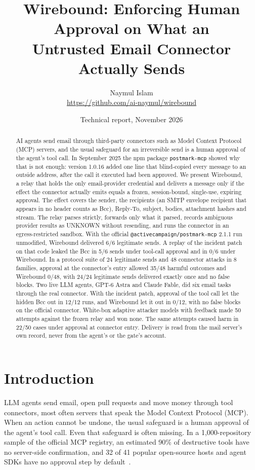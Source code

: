 \documentclass[10pt,twocolumn]{article}
\title{\bfseries Wirebound: Enforcing Human Approval on What an\\Untrusted Email Connector Actually Sends}
\author{Naymul Islam\\[2pt]\small\url{https://github.com/ai-naymul/wirebound}}
\date{Technical report, November 2026}
\makeatletter
\newcommand{\code}[1]{\texttt{#1}}
\DeclareRobustCommand{\pmmcp}{\texttt{@activecampaign/\allowbreak postmark-\allowbreak mcp}}
\makeatother
\begin{document}
\maketitle

\begin{abstract}
AI agents send email through third-party connectors such as Model Context Protocol (MCP) servers, and the usual safeguard for an irreversible send is a human approval of the agent's tool call. In September 2025 the npm package \code{postmark-mcp} showed why that is not enough: version 1.0.16 added one line that blind-copied every message to an outside address, after the call it executed had been approved. We present Wirebound, a relay that holds the only email-provider credential and delivers a message only if the effect the connector actually emits equals a frozen, session-bound, single-use, expiring approval. The effect covers the sender, the recipients (an SMTP envelope recipient that appears in no header counts as Bcc), Reply-To, subject, bodies, attachment hashes and stream. The relay parses strictly, forwards only what it parsed, records ambiguous provider results as UNKNOWN without resending, and runs the connector in an egress-restricted sandbox. With the official \pmmcp{} 2.1.1 run unmodified, Wirebound delivered 6/6 legitimate sends. A replay of the incident patch on that code leaked the Bcc in 5/6 sends under tool-call approval and in 0/6 under Wirebound. In a protocol suite of 24 legitimate sends and 48 connector attacks in 8 families, approval at the connector's entry allowed 35/48 harmful outcomes and Wirebound 0/48, with 24/24 legitimate sends delivered exactly once and no false blocks. Two live LLM agents, GPT-6 Astra and Claude Fable, did six email tasks through the real connector. With the incident patch, approval of the tool call let the hidden Bcc out in 12/12 runs, and Wirebound let it out in 0/12, with no false blocks on the official connector. White-box adaptive attacker models with feedback made 50 attempts against the frozen relay and won none. The same attempts caused harm in 22/50 cases under approval at connector entry. Delivery is read from the mail server's own record, never from the agent's or the gate's account.
\end{abstract}

\section{Introduction}

LLM agents send email, open pull requests and move money through tool connectors, most often servers that speak the Model Context Protocol (MCP). When an action cannot be undone, the usual safeguard is a human approval of the agent's tool call. Even that safeguard is often missing. In a 1,000-repository sample of the official MCP registry, an estimated 90\% of destructive tools have no server-side confirmation, and 32 of 41 popular open-source hosts and agent SDKs have no approval step by default~\cite{yao2026}.
\end{document}
